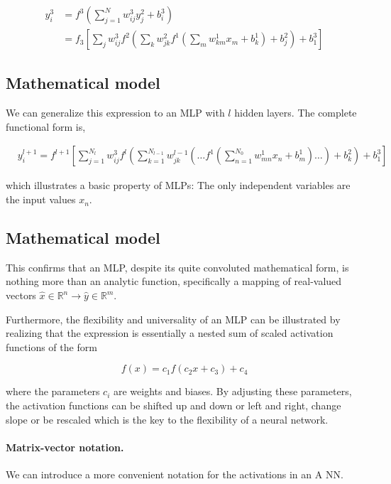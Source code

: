 \documentclass[%
oneside,                 %
final,                   %
10pt]{article}
\begin{document}
\begin{align}
 y_i^3 &= f^3\left(\sum_{j=1}^N w_{ij}^3 y_j^2 + b_i^3\right) \\
 &= f_3\left[\sum_{j} w_{ij}^3 f^2\left(\sum_{k} w_{jk}^2 f^1\left(\sum_{m} w_{km}^1 x_m + b_k^1\right) + b_j^2\right)
  + b_1^3\right]
\end{align}

\subsection{Mathematical model}

We can generalize this expression to an MLP with $l$ hidden
layers. The complete functional form is,

\begin{align}
&y^{l+1}_i = f^{l+1}\left[\!\sum_{j=1}^{N_l} w_{ij}^3 f^l\left(\sum_{k=1}^{N_{l-1}}w_{jk}^{l-1}\left(\dots f^1\left(\sum_{n=1}^{N_0} w_{mn}^1 x_n+ b_m^1\right)\dots\right)+b_k^2\right)+b_1^3\right] &&
 \label{completeNN}
\end{align}

which illustrates a basic property of MLPs: The only independent
variables are the input values $x_n$.

\subsection{Mathematical model}

This confirms that an MLP, despite its quite convoluted mathematical
form, is nothing more than an analytic function, specifically a
mapping of real-valued vectors $\hat{x} \in \mathbb{R}^n \rightarrow
\hat{y} \in \mathbb{R}^m$.

Furthermore, the flexibility and universality of an MLP can be
illustrated by realizing that the expression is essentially a nested
sum of scaled activation functions of the form

\begin{equation}
 f(x) = c_1 f(c_2 x + c_3) + c_4
\end{equation}

where the parameters $c_i$ are weights and biases. By adjusting these
parameters, the activation functions can be shifted up and down or
left and right, change slope or be rescaled which is the key to the
flexibility of a neural network.

\paragraph{Matrix-vector notation.}
We can introduce a more convenient notation for the activations in an A NN. 
\end{document}
